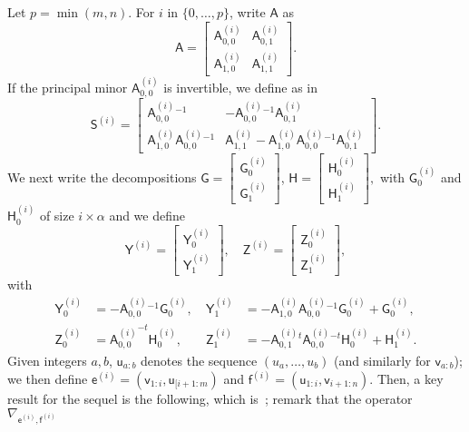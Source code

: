 \documentclass{sig-alternate}
\newcommand{\ve}{\ensuremath{\mathsf{e}}}
\newcommand{\vf}{\ensuremath{\mathsf{f}}}
\newcommand{\vu}{\ensuremath{\mathsf{u}}}
\newcommand{\vv}{\ensuremath{\mathsf{v}}}
\newcommand{\mA}{\ensuremath{\mathsf{A}}}
\newcommand{\mG}{\ensuremath{\mathsf{G}}}
\newcommand{\mH}{\ensuremath{\mathsf{H}}}
\newcommand{\mS}{\ensuremath{\mathsf{S}}}
\newcommand{\mY}{\ensuremath{\mathsf{Y}}}
\newcommand{\mZ}{\ensuremath{\mathsf{Z}}}
\begin{document}
Let $p=\min(m,n)$. For $i$ in $\{0,\dots,p\}$, write $\mA$ as
$$\mA=\left [\begin{matrix} {\mA^{(i)}_{0,0}} & \mA^{(i)}_{0,1} \\[1mm] \mA^{(i)}_{1,0} & \mA^{(i)}_{1,1}
\end{matrix}\right ].$$ 
If the principal minor
 ${\mA^{(i)}_{0,0}}$  is invertible, we define as in~\cite{Cardinal99}
$$\mS^{(i)} = \left [\begin{matrix} {\mA^{(i)}_{0,0}}{}^{-1} & -{\mA^{(i)}_{0,0}}{}^{-1} \mA^{(i)}_{0,1} \\[1mm] \mA^{(i)}_{1,0} {\mA^{(i)}_{0,0}}{}^{-1}& \mA^{(i)}_{1,1} - \mA^{(i)}_{1,0} {\mA^{(i)}_{0,0}}{}^{-1} \mA^{(i)}_{0,1} 
\end{matrix}\right ].$$
We next write the decompositions $\mG=\left [\begin{matrix}
    \mG^{(i)}_0 \\    \mG^{(i)}_1 
  \end{matrix}\right ]$, $\mH=\left [\begin{matrix} 
        \mH^{(i)}_0 \\    \mH^{(i)}_1 
  \end{matrix}\right ],$
with $\mG^{(i)}_0$ and $\mH^{(i)}_0$ of size $i \times \alpha$
and
we define
\begin{equation}
\mY^{(i)}
 = \left [\begin{matrix}
  \mY^{(i)}_0 \\    \mY^{(i)}_1 
     \end{matrix} \right ],\quad
\mZ^{(i)}
 = \left [\begin{matrix}
  \mZ^{(i)}_0 \\    \mZ^{(i)}_1 
     \end{matrix} \right ],
\end{equation}
with
\begin{align}
\mY^{(i)}_0&= -{\mA^{(i)}_{0,0}}{}^{-1} \mG^{(i)}_0,\  
&\mY^{(i)}_1&=-\mA^{(i)}_{1,0}{\mA^{(i)}_{0,0}}{}^{-1}\mG^{(i)}_0 + \mG^{(i)}_0,\label{eq:defYi}\\
\mZ^{(i)}_0&= {\mA^{(i)}_{0,0}}^{-t} \mH^{(i)}_0,\  
&\mZ^{(i)}_1&=-{\mA^{(i)}_{0,1}}{}^t{\mA^{(i)}_{0,0}}{}^{-t}\mH^{(i)}_0 + \mH^{(i)}_1\label{eq:defZi}.
\end{align}
Given integers $a,b$, $\vu_{a:b}$ denotes the sequence
$(u_a,\dots,u_b)$ (and similarly for $\vv_{a:b}$); we then
define $\ve^{(i)}=(\vv_{1:i},\vu_{[i+1:m})$ and
$\vf^{(i)}=(\vu_{1:i},\vv_{i+1:n})$.
Then, a key result for the sequel is the following, which
is~\cite[Proposition~1]{Cardinal99}; remark that the operator $\nabla_{\ve^{(i)},\vf^{(i)}}$
\end{document}
